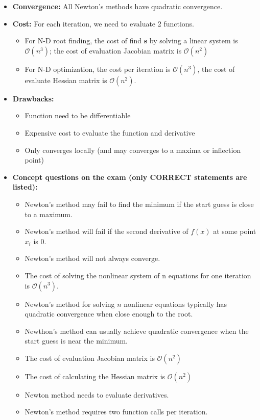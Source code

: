 \documentclass[12pt]{article}
\begin{document}
    \begin{itemize}
        \item \textbf{Convergence:} All Newton's methods have quadratic convergence.
        \item \textbf{Cost:} For each iteration, we need to evaluate 2 functions.
            \begin{itemize}
                \item For N-D root finding, the cost of find $\mathbf{s}$ by solving a linear system is $\mathcal{O}(n^3)$; the cost of evaluation Jacobian matrix is $\mathcal{O}(n^2)$
                \item For N-D optimization, the cost per iteration is $\mathcal{O}(n^3)$, the cost of evaluate Hessian matrix is $\mathcal{O}(n^2)$.
            \end{itemize}
        \item \textbf{Drawbacks: }
            \begin{itemize}
                \item Function need to be differentiable
                \item Expensive cost to evaluate the function and derivative
                \item Only converges locally (and may converges to a maxima or inflection point)
            \end{itemize}
        \item \textbf{Concept questions on the exam (only CORRECT statements are listed):}
            \begin{itemize}[label={\checkmark}]
                \item Newton's method may fail to find the minimum if the start guess is close to a maximum.
                \item Newton's method will fail if the second derivative of $f(x)$ at some point $x_i$ is 0.
                \item Newton's method will not always converge.
                \item  The cost of solving the nonlinear system of n equations for one iteration is $\mathcal{O}(n^3)$.
                \item Newton's method for solving $n$ nonlinear equations typically has quadratic convergence when close enough to the root.
                \item Newthon's method can usually achieve quadratic convergence when the start guess is near the minimum.
                \item The cost of evaluation Jacobian matrix is $\mathcal{O}(n^2)$
                \item The cost of calculating the Hessian matrix is $\mathcal{O}(n^2)$
                \item Newton method needs to evaluate derivatives.
                \item Newton's method requires two function calls per iteration.
            \end{itemize}
    \end{itemize}
\end{document}
